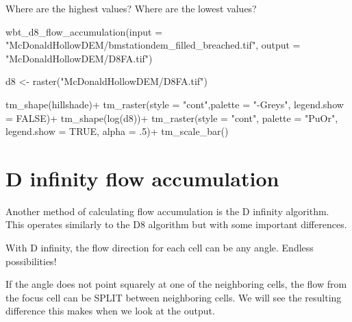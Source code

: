 \documentclass[
]{book}
\newenvironment{Shaded}{\begin{snugshade}}{\end{snugshade}}
\newcommand{\AttributeTok}[1]{\textcolor[rgb]{0.77,0.63,0.00}{#1}}
\newcommand{\ConstantTok}[1]{\textcolor[rgb]{0.00,0.00,0.00}{#1}}
\newcommand{\DecValTok}[1]{\textcolor[rgb]{0.00,0.00,0.81}{#1}}
\newcommand{\FunctionTok}[1]{\textcolor[rgb]{0.00,0.00,0.00}{#1}}
\newcommand{\NormalTok}[1]{#1}
\newcommand{\OtherTok}[1]{\textcolor[rgb]{0.56,0.35,0.01}{#1}}
\newcommand{\SpecialCharTok}[1]{\textcolor[rgb]{0.00,0.00,0.00}{#1}}
\newcommand{\StringTok}[1]{\textcolor[rgb]{0.31,0.60,0.02}{#1}}
\begin{document}
Where are the highest values?
Where are the lowest values?

\begin{Shaded}
\begin{Highlighting}[]
\FunctionTok{wbt\_d8\_flow\_accumulation}\NormalTok{(}\AttributeTok{input =} \StringTok{"McDonaldHollowDEM/bmstationdem\_filled\_breached.tif"}\NormalTok{,}
                         \AttributeTok{output =} \StringTok{"McDonaldHollowDEM/D8FA.tif"}\NormalTok{)}

\NormalTok{d8 }\OtherTok{\textless{}{-}} \FunctionTok{raster}\NormalTok{(}\StringTok{"McDonaldHollowDEM/D8FA.tif"}\NormalTok{)}

\FunctionTok{tm\_shape}\NormalTok{(hillshade)}\SpecialCharTok{+}
  \FunctionTok{tm\_raster}\NormalTok{(}\AttributeTok{style =} \StringTok{"cont"}\NormalTok{,}\AttributeTok{palette =} \StringTok{"{-}Greys"}\NormalTok{, }\AttributeTok{legend.show =} \ConstantTok{FALSE}\NormalTok{)}\SpecialCharTok{+}
\FunctionTok{tm\_shape}\NormalTok{(}\FunctionTok{log}\NormalTok{(d8))}\SpecialCharTok{+}
  \FunctionTok{tm\_raster}\NormalTok{(}\AttributeTok{style =} \StringTok{"cont"}\NormalTok{, }\AttributeTok{palette =} \StringTok{"PuOr"}\NormalTok{, }\AttributeTok{legend.show =} \ConstantTok{TRUE}\NormalTok{, }\AttributeTok{alpha =}\NormalTok{ .}\DecValTok{5}\NormalTok{)}\SpecialCharTok{+}
  \FunctionTok{tm\_scale\_bar}\NormalTok{()}
\end{Highlighting}
\end{Shaded}

\hypertarget{d-infinity-flow-accumulation}{%
\section{D infinity flow accumulation}\label{d-infinity-flow-accumulation}}

Another method of calculating flow accumulation is the D infinity algorithm. This operates similarly to the D8 algorithm but with some important differences.

With D infinity, the flow direction for each cell can be any angle. Endless possibilities!

If the angle does not point squarely at one of the neighboring cells, the flow from the focus cell can be SPLIT between neighboring cells. We will see the resulting difference this makes when we look at the output.
\end{document}
